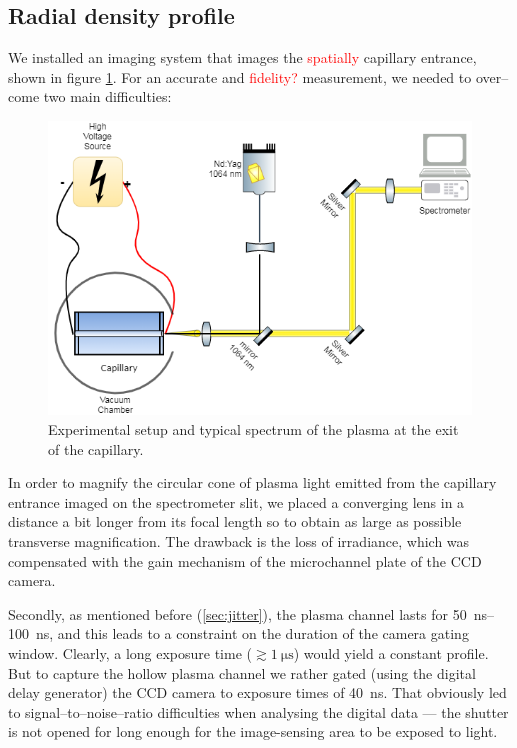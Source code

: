 \documentclass[justified,nofonts,nobib,openany]{tufte-book}
\begin{document}
\subsection{Radial density profile}\label{ssec:radial}
We installed an imaging system that images the \textcolor{red}{spatially} capillary entrance, shown in figure \ref{fig:radial_system}. For an accurate and \textcolor{red}{fidelity?} measurement, we needed to over--come two main difficulties:

	\begin{figure}
	\centering
	    \includegraphics[width=\textwidth]{./figures/spectro/radial_system.png}
	    \caption{Experimental setup and typical spectrum of the plasma at the exit of the capillary.}
	    \label{fig:radial_system}
	\end{figure}

In order to magnify the circular cone of plasma light emitted from the capillary entrance imaged on the spectrometer slit, we placed a converging lens in a distance a bit longer from its focal length so to obtain as large as possible transverse magnification. The drawback is the loss of irradiance, which was compensated with the gain mechanism of the microchannel plate of the CCD camera.

Secondly, as mentioned before (\ref{sec:jitter}), the plasma channel lasts for \SIrange{50}{100}{\ns}, and this leads to a constraint on the duration of the camera gating window. Clearly, a long exposure time ($\gtrsim \SI{1}{\us}$) would yield a constant profile. But to capture the hollow plasma channel we rather gated (using the digital delay generator) the CCD camera to exposure times of \SI{40}{\ns}. That obviously led to signal--to--noise--ratio difficulties when analysing the digital data --- the shutter is not opened for long enough for the image-sensing area to be exposed to light.
\end{document}
